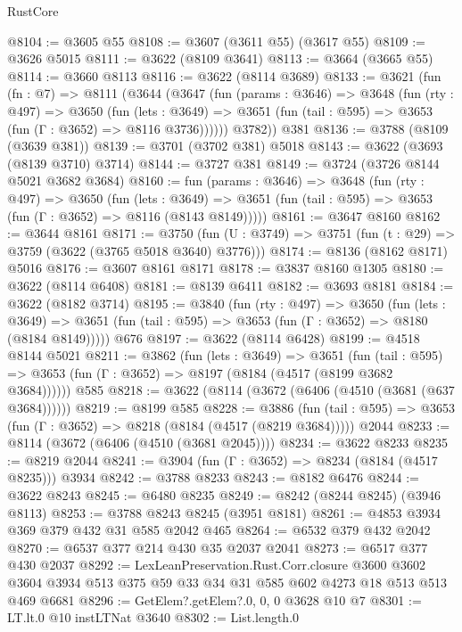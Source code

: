 \begin{lexlean}{RustCore}
\begin{coremodule}
@8104 := @3605 @55
@8108 := @3607 (@3611 @55) (@3617 @55)
@8109 := @3626 @5015
@8111 := @3622 (@8109 @3641)
@8113 := @3664 (@3665 @55)
@8114 := @3660 @8113
@8116 := @3622 (@8114 @3689)
@8133 := @3621
    (fun (fn : @7) =>
    @8111
      (@3644
        (@3647
          (fun (params : @3646) =>
          @3648
            (fun (rty : @497) =>
            @3650
              (fun (lets : @3649) =>
              @3651 (fun (tail : @595) => @3653 (fun (Γ : @3652) => @8116 @3736))))))
        @3782))
    @381
@8136 := @3788 (@8109 (@3639 @381))
@8139 := @3701 (@3702 @381) @5018
@8143 := @3622 (@3693 (@8139 @3710) @3714)
@8144 := @3727 @381
@8149 := @3724 (@3726 @8144 @5021 @3682 @3684)
@8160 := fun (params : @3646) =>
  @3648
    (fun (rty : @497) =>
    @3650
      (fun (lets : @3649) =>
      @3651 (fun (tail : @595) => @3653 (fun (Γ : @3652) => @8116 (@8143 @8149)))))
@8161 := @3647 @8160
@8162 := @3644 @8161
@8171 := @3750 (fun (U : @3749) => @3751 (fun (t : @29) => @3759 (@3622 (@3765 @5018 @3640) @3776)))
@8174 := @8136 (@8162 @8171) @5016
@8176 := @3607 @8161 @8171
@8178 := @3837 @8160 @1305
@8180 := @3622 (@8114 @6408)
@8181 := @8139 @6411
@8182 := @3693 @8181
@8184 := @3622 (@8182 @3714)
@8195 := @3840
    (fun (rty : @497) =>
    @3650
      (fun (lets : @3649) =>
      @3651 (fun (tail : @595) => @3653 (fun (Γ : @3652) => @8180 (@8184 @8149)))))
    @676
@8197 := @3622 (@8114 @6428)
@8199 := @4518 @8144 @5021
@8211 := @3862
    (fun (lets : @3649) =>
    @3651
      (fun (tail : @595) => @3653 (fun (Γ : @3652) => @8197 (@8184 (@4517 (@8199 @3682 @3684))))))
    @585
@8218 := @3622 (@8114 (@3672 (@6406 (@4510 (@3681 (@637 @3684))))))
@8219 := @8199 @585
@8228 := @3886
    (fun (tail : @595) => @3653 (fun (Γ : @3652) => @8218 (@8184 (@4517 (@8219 @3684)))))
    @2044
@8233 := @8114 (@3672 (@6406 (@4510 (@3681 @2045))))
@8234 := @3622 @8233
@8235 := @8219 @2044
@8241 := @3904 (fun (Γ : @3652) => @8234 (@8184 (@4517 @8235))) @3934
@8242 := @3788 @8233
@8243 := @8182 @6476
@8244 := @3622 @8243
@8245 := @6480 @8235
@8249 := @8242 (@8244 @8245) (@3946 @8113)
@8253 := @3788 @8243 @8245 (@3951 @8181)
@8261 := @4853 @3934 @369 @379 @432 @31 @585 @2042 @465
@8264 := @6532 @379 @432 @2042
@8270 := @6537 @377 @214 @430 @35 @2037 @2041
@8273 := @6517 @377 @430 @2037
@8292 := LexLeanPreservation.Rust.Corr.closure
    @3600
    @3602
    @3604
    @3934
    @513
    @375
    @59
    @33
    @34
    @31
    @585
    @602
    @4273
    @18
    @513
    @513
    @469
    @6681
@8296 := GetElem?.getElem?.{0, 0, 0} @3628 @10 @7
@8301 := LT.lt.{0} @10 instLTNat @3640
@8302 := List.length.{0}

\end{coremodule}
\end{lexlean}
